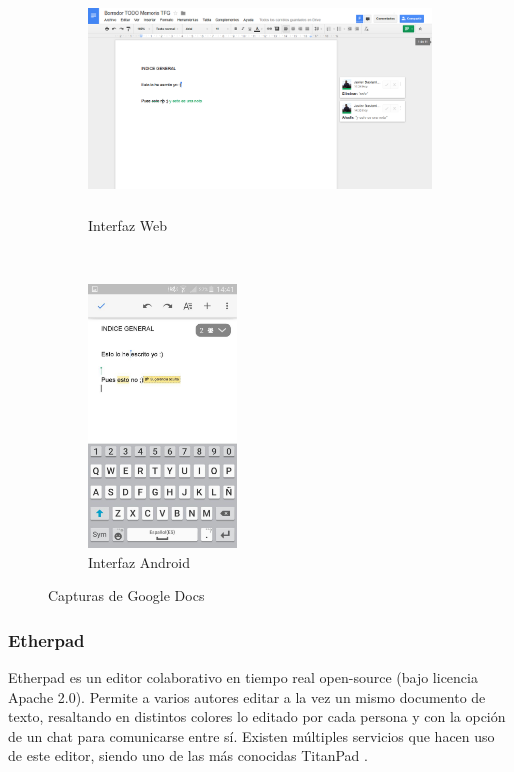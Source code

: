 	\begin{figure}[H]
        \centering
        \begin{subfigure}[b]{0.6\textwidth}
                \includegraphics[width=\textwidth, height=6cm]{Media/Captures/googleDocsWeb.png}
                \caption{Interfaz Web}
                \label{fig:googleDocsWeb}
        \end{subfigure}
        ~
        \begin{subfigure}[b]{0.3\textwidth}
                \includegraphics[width=\textwidth, height=7cm]{Media/Captures/googleDocsApp.jpg}
                \caption{Interfaz Android}
                \label{fig:googleDocsApp}
        \end{subfigure}
        \caption{Capturas de Google Docs}\label{fig:googleDocsCaptures}
	\end{figure}
	
	\subsubsection{Etherpad}
	
	Etherpad \cite{ref:etherpad} es un editor colaborativo en tiempo real open-source (bajo licencia Apache 2.0). Permite a varios autores editar a la vez un mismo documento de texto, resaltando en distintos colores lo editado por cada persona y con la opción de un chat para comunicarse entre sí. Existen múltiples servicios que hacen uso de este editor, siendo uno de las más conocidas TitanPad \cite{ref:titanpad}.
	
